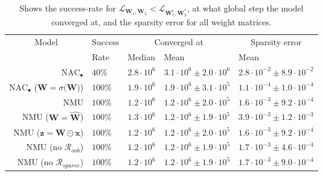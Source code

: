 \begin{table}[H]

\caption{\label{tab:function-task-static-ablation}Shows the success-rate for $\mathcal{L}_{\mathbf{W}_1, \mathbf{W}_2} < \mathcal{L}_{\mathbf{W}_1^\epsilon, \mathbf{W}_2^*}$, at what global step the model converged at, and the sparsity error for all weight matrices.}
\centering
\begin{tabular}{rllll}
\toprule
\multicolumn{1}{c}{Model} & \multicolumn{1}{c}{Success} & \multicolumn{2}{c}{Converged at} & \multicolumn{1}{c}{Sparsity error} \\
\cmidrule(l{3pt}r{3pt}){1-1} \cmidrule(l{3pt}r{3pt}){2-2} \cmidrule(l{3pt}r{3pt}){3-4} \cmidrule(l{3pt}r{3pt}){5-5}
 & Rate & Median & Mean & Mean\\
\midrule
$\mathrm{NAC}_{\bullet}$ & $40\%$ & $2.8 \cdot 10^{6}$ & $3.1 \cdot 10^{6} \pm 2.0 \cdot 10^{6}$ & $2.8 \cdot 10^{-2} \pm 8.9 \cdot 10^{-2}$\\

$\mathrm{NAC}_{\bullet}$ ($\mathbf{W} = \sigma(\mathbf{\hat{W}}$)) & $100\%$ & $1.9 \cdot 10^{6}$ & $1.9 \cdot 10^{6} \pm 3.1 \cdot 10^{5}$ & $1.1 \cdot 10^{-4} \pm 1.0 \cdot 10^{-4}$\\

NMU & $100\%$ & $1.2 \cdot 10^{6}$ & $1.2 \cdot 10^{6} \pm 2.0 \cdot 10^{5}$ & $1.6 \cdot 10^{-3} \pm 9.2 \cdot 10^{-4}$\\

NMU ($\mathbf{W} = \mathbf{\hat{W}}$) & $100\%$ & $1.3 \cdot 10^{6}$ & $1.2 \cdot 10^{6} \pm 1.9 \cdot 10^{5}$ & $3.9 \cdot 10^{-3} \pm 1.2 \cdot 10^{-3}$\\

NMU ($\mathbf{z} = \mathbf{W} \odot \mathbf{x}$) & $100\%$ & $1.2 \cdot 10^{6}$ & $1.2 \cdot 10^{6} \pm 2.0 \cdot 10^{5}$ & $1.6 \cdot 10^{-3} \pm 9.2 \cdot 10^{-4}$\\

NMU (no $\mathcal{R}_{oob}$) & $100\%$ & $1.2 \cdot 10^{6}$ & $1.2 \cdot 10^{6} \pm 1.9 \cdot 10^{5}$ & $1.7 \cdot 10^{-3} \pm 4.6 \cdot 10^{-4}$\\

NMU (no $\mathcal{R}_{sparse}$) & $100\%$ & $1.2 \cdot 10^{6}$ & $1.2 \cdot 10^{6} \pm 1.9 \cdot 10^{5}$ & $1.7 \cdot 10^{-3} \pm 9.0 \cdot 10^{-4}$\\
\bottomrule
\end{tabular}
\end{table}
